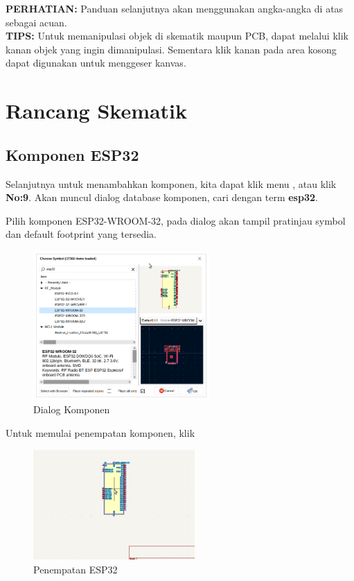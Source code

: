 \documentclass[12pt]{book}
\begin{document}
	\textbf{PERHATIAN:} Panduan selanjutnya akan menggunakan angka-angka di atas sebagai acuan.\\

	\textbf{TIPS:} Untuk memanipulasi objek di skematik maupun PCB, dapat melalui klik kanan objek yang ingin dimanipulasi.
	Sementara klik kanan pada area kosong dapat digunakan untuk menggeser kanvas.

	\newpage
	\section{Rancang Skematik}

	\subsection{Komponen ESP32}

	Selanjutnya untuk menambahkan komponen, kita dapat klik menu , atau klik \textbf{No:9}.
	Akan muncul dialog database komponen, cari dengan term \textbf{esp32}.

	Pilih komponen ESP32-WROOM-32, pada dialog akan tampil pratinjau symbol dan default footprint yang tersedia.
	\begin{figure}[!ht]
		\centering
		\includegraphics[width=0.6\textwidth]{images/sch/sch_2}
		\caption{Dialog Komponen}
	\end{figure}

	Untuk memulai penempatan komponen, klik 

	\begin{figure}[!ht]
		\centering
		\includegraphics[width=0.55\textwidth]{images/sch/sch_3}
		\caption{Penempatan ESP32}
	\end{figure}
\end{document}
